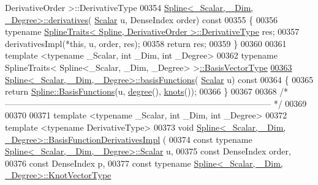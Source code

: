 \begin{DoxyCode}
      DerivativeOrder >::DerivativeType
00354     \hyperlink{group___splines___module_a196730cf190dfa16907db888277e5aed}{Spline<\_Scalar, \_Dim, \_Degree>::derivatives}(
      \hyperlink{group___splines___module_a8cafd78b564825c76fbb3419653d9742}{Scalar} u, DenseIndex order)\textcolor{keyword}{ const}
00355 \textcolor{keyword}{  }\{
00356     \textcolor{keyword}{typename} \hyperlink{struct_eigen_1_1_spline_traits}{SplineTraits< Spline, DerivativeOrder >::DerivativeType}
       res;
00357     derivativesImpl(*\textcolor{keyword}{this}, u, order, res);
00358     \textcolor{keywordflow}{return} res;
00359   \}
00360 
00361   \textcolor{keyword}{template} <\textcolor{keyword}{typename} \_Scalar, \textcolor{keywordtype}{int} \_Dim, \textcolor{keywordtype}{int} \_Degree>
00362   \textcolor{keyword}{typename} SplineTraits< Spline<\_Scalar, \_Dim, \_Degree> >\hyperlink{group___splines___module_a1d49cef942ea59d85d1711ee32354e6b}{::BasisVectorType}
\hyperlink{group___splines___module_afe0997f0bb02a3fac3073016abac04c6}{00363}     \hyperlink{group___splines___module_afe0997f0bb02a3fac3073016abac04c6}{Spline<\_Scalar, \_Dim, \_Degree>::basisFunctions}(
      \hyperlink{group___splines___module_a8cafd78b564825c76fbb3419653d9742}{Scalar} u)\textcolor{keyword}{ const}
00364 \textcolor{keyword}{  }\{
00365     \textcolor{keywordflow}{return} \hyperlink{group___splines___module_a038506788499d71aedddc5211c33bb6e}{Spline::BasisFunctions}(u, \hyperlink{group___splines___module_a0df23e941ac0f31dcd095a4dd4f4a7ec}{degree}(), \hyperlink{group___splines___module_ae3eac8af580ad880d8ad3a259d453aa1}{knots}());
00366   \}
00367 
00368   \textcolor{comment}{/* --------------------------------------------------------------------------------------------- */}
00369   
00370   
00371   \textcolor{keyword}{template} <\textcolor{keyword}{typename} \_Scalar, \textcolor{keywordtype}{int} \_Dim, \textcolor{keywordtype}{int} \_Degree>
00372   \textcolor{keyword}{template} <\textcolor{keyword}{typename} DerivativeType>
00373   \textcolor{keywordtype}{void} \hyperlink{group___splines___module_class_eigen_1_1_spline}{Spline<\_Scalar, \_Dim, \_Degree>::BasisFunctionDerivativesImpl}
      (
00374     \textcolor{keyword}{const} \textcolor{keyword}{typename} \hyperlink{group___splines___module_a8cafd78b564825c76fbb3419653d9742}{Spline<\_Scalar, \_Dim, \_Degree>::Scalar} u,
00375     \textcolor{keyword}{const} DenseIndex order,
00376     \textcolor{keyword}{const} DenseIndex p, 
00377     \textcolor{keyword}{const} \textcolor{keyword}{typename} \hyperlink{group___splines___module_a066f7a8b120316c9068b559f0790e9ec}{Spline<\_Scalar, \_Dim, \_Degree>::KnotVectorType}

\end{DoxyCode}
